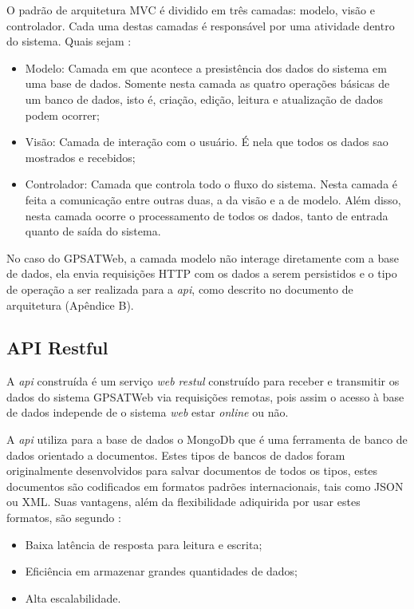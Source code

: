         O padrão de arquitetura MVC é dividido em três camadas: modelo, visão e controlador. Cada uma destas camadas é responsável por uma atividade dentro do sistema. Quais sejam \cite{Lemos2013}:
            \begin{itemize}
                \item Modelo: Camada em que acontece a presistência dos dados do sistema em uma base de dados. Somente nesta camada as quatro operações básicas de um banco de dados, isto é, criação, edição, leitura e atualização de dados podem ocorrer;
                \item Visão: Camada de interação com o usuário. É nela que todos os dados sao mostrados e recebidos;
                \item Controlador: Camada que controla todo o fluxo do sistema. Nesta camada é feita a comunicação entre outras duas, a da visão e a de modelo. Além disso, nesta camada ocorre o processamento de todos os dados, tanto de entrada quanto de saída do sistema.
            \end{itemize}

        No caso do GPSATWeb, a camada modelo não interage diretamente com a base de dados, ela envia requisições HTTP com os dados a serem persistidos e o tipo de operação a ser realizada para a \textit{api}, como descrito no documento de arquitetura (Apêndice B). 
        
    \subsection{API Restful}
        A \textit{api} construída é um serviço \textit{web restul} construído para receber e transmitir os dados do sistema GPSATWeb via requisições remotas, pois assim o acesso à base de dados independe de o sistema \textit{web} estar \textit{online} ou não. 

        A \textit{api} utiliza para a base de dados o MongoDb que é uma ferramenta de banco de dados orientado a documentos. Estes tipos de bancos de dados foram originalmente desenvolvidos para salvar documentos de todos os tipos, estes documentos são codificados em formatos padrões internacionais, tais como JSON ou XML. Suas vantagens, além da flexibilidade adiquirida por usar estes formatos, são segundo \cite{Moniruzzaman2013}:
        \begin{itemize}
            \item Baixa latência de resposta para leitura e escrita;
            \item Eficiência em armazenar grandes quantidades de dados;
            \item Alta escalabilidade.
        \end{itemize}

